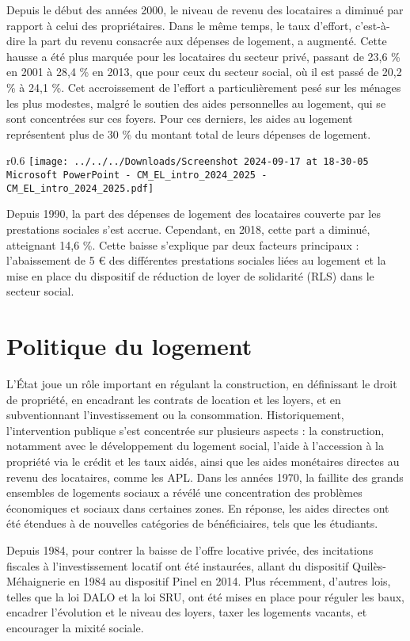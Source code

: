 \documentclass[a4paper, 12pt]{report}
\begin{document}
Depuis le début des années 2000, le niveau de revenu des locataires a diminué par rapport à celui des propriétaires. Dans le même temps, le taux d’effort, c’est-à-dire la part du revenu consacrée aux dépenses de logement, a augmenté. Cette hausse a été plus marquée pour les locataires du secteur privé, passant de 23,6 \% en 2001 à 28,4 \% en 2013, que pour ceux du secteur social, où il est passé de 20,2 \% à 24,1 \%. Cet accroissement de l'effort a particulièrement pesé sur les ménages les plus modestes, malgré le soutien des aides personnelles au logement, qui se sont concentrées sur ces foyers. Pour ces derniers, les aides au logement représentent plus de 30 \% du montant total de leurs dépenses de logement.
\newpage
\begin{wrapfigure}{r}{0.6\textwidth}
	\centering
\texttt{[image: ../../../Downloads/Screenshot 2024-09-17 at 18-30-05 Microsoft PowerPoint - CM\_EL\_intro\_2024\_2025 - CM\_EL\_intro\_2024\_2025.pdf]}
\end{wrapfigure}

Depuis 1990, la part des dépenses de logement des locataires couverte par les prestations sociales s'est accrue. Cependant, en 2018, cette part a diminué, atteignant 14,6 \%. Cette baisse s'explique par deux facteurs principaux : l'abaissement de 5 € des différentes prestations sociales liées au logement et la mise en place du dispositif de réduction de loyer de solidarité (RLS) dans le secteur social.

\section{Politique du logement}

L'État joue un rôle important en régulant la construction, en définissant le droit de propriété, en encadrant les contrats de location et les loyers, et en subventionnant l'investissement ou la consommation. Historiquement, l'intervention publique s'est concentrée sur plusieurs aspects : la construction, notamment avec le développement du logement social, l'aide à l'accession à la propriété via le crédit et les taux aidés, ainsi que les aides monétaires directes au revenu des locataires, comme les APL. Dans les années 1970, la faillite des grands ensembles de logements sociaux a révélé une concentration des problèmes économiques et sociaux dans certaines zones. En réponse, les aides directes ont été étendues à de nouvelles catégories de bénéficiaires, tels que les étudiants.

Depuis 1984, pour contrer la baisse de l’offre locative privée, des incitations fiscales à l’investissement locatif ont été instaurées, allant du dispositif Quilès-Méhaignerie en 1984 au dispositif Pinel en 2014. Plus récemment, d’autres lois, telles que la loi DALO et la loi SRU, ont été mises en place pour réguler les baux, encadrer l’évolution et le niveau des loyers, taxer les logements vacants, et encourager la mixité sociale.
\end{document}
